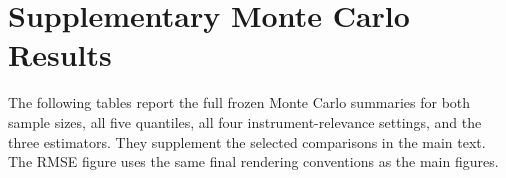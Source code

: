 \section{Supplementary Monte Carlo Results}
\label{app:supplementary-results}

The following tables report the full frozen Monte Carlo summaries for both sample sizes, all five quantiles, all four instrument-relevance settings, and the three estimators. They supplement the selected comparisons in the main text. The RMSE figure uses the same final rendering conventions as the main figures.






\clearpage
